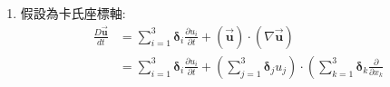 \documentclass[../main.tex]{subfiles}
\begin{document}
\begin{itemize}
\begin{itemize}
\begin{enumerate}
\begin{equation}
          \end{equation}
          $\bm \delta_z$方向:
          \begin{equation}
            u_r \frac{\partial u_z}{\partial r} + \frac{u_\theta}{r} \frac{\partial u_z}{\partial \theta} + u_z \frac{\partial u_z}{\partial z}
          \end{equation}
          與此同理，$\frac{\partial \vec{\bm u}}{\partial t}$也可以直接寫出來:
          \begin{equation}
            \frac{\partial \vec{\bm u}}{\partial t} =
            \bm\delta_r \frac{\partial u_r}{\partial t} +
            \bm\delta_\theta \frac{\partial u_\theta}{\partial t} +
            \bm\delta_z \frac{\partial u_z}{\partial t}
          \end{equation}
          最後將兩者相加，即為Equation of Motion中的$D\vec{\bm u}/dt$
          \begin{align}
            \frac{D \vec{\bm u}}{dt}  &= 
            \bm\delta_r \left[
              \frac{\partial u_r}{\partial t} +
              u_r \frac{\partial u_r}{\partial r} + u_\theta \left(\frac{1}{r}\frac{\partial u_r}{\partial\theta} - \frac{u_\theta}{r}\right) + u_z \frac{\partial u_r}{\partial z}
            \right] \nonumber\\
            &+ \bm\delta_\theta \left[
              \frac{\partial u_\theta}{\partial t} +
              u_r \frac{\partial u_\theta}{\partial r} + u_\theta \left(\frac{1}{r} \frac{\partial u_\theta}{\partial \theta}+\frac{u_r}{r}\right) + u_z \frac{\partial u_\theta}{\partial z}
            \right] \nonumber\\
            &+ \bm\delta_z \left[
              \frac{\partial u_z}{\partial t} +
              u_r \frac{\partial u_z}{\partial r} + \frac{u_\theta}{r} \frac{\partial u_z}{\partial \theta} + u_z \frac{\partial u_z}{\partial z}
            \right]
          \end{align}
        \item 假設為卡氏座標軸:
          \begin{align}
            \frac{D \vec{\bm u}}{dt}  &= \sum_{i=1}^3 \bm\delta_i \frac{\partial u_i}{\partial t} 
            + \left( \vec{\bm u} \right) \cdot\left(\nabla \vec{\bm u}\right) \nonumber\\
            &= \sum_{i=1}^3 \bm\delta_i \frac{\partial u_i}{\partial t} + 
            \left(
              \sum_{j=1}^3 \bm\delta_j u_j
            \right) \cdot
            \left(
              \sum_{k=1}^3 \bm\delta_k \frac{\partial }{\partial x_k}

\end{align}
\end{enumerate}
\end{itemize}
\end{itemize}
\end{document}
